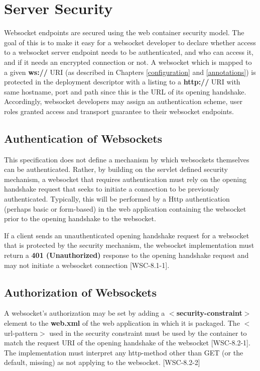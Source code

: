\chapter{Server Security}
\label{security}

Websocket endpoints are secured using the web container security model. The goal of this is to make it easy for a websocket developer to declare whether access to a websocket server endpoint needs to be authenticated, and who can access it, and if it needs an encrypted connection or not. A websocket which is mapped to a given \textbf{ws://} URI (as described in Chapters \ref{configuration} and \ref{annotations}) is protected in the deployment descriptor with a listing to a \textbf{http://} URI with same hostname, port and path since this is the URL of its opening handshake.
Accordingly, websocket developers may assign an authentication scheme, user roles granted access and transport guarantee to their websocket endpoints. 

\section{Authentication of Websockets}

This specification does not define a mechanism by which websockets themselves can be authenticated. Rather, by building on the servlet defined security mechanism, a websocket that requires authentication must rely on the opening handshake request that seeks to initiate a connection to be previously authenticated. Typically, this will be performed by a Http authentication (perhaps basic or form-based) in the web application containing the websocket prior to the opening handshake to the websocket.

If a client sends an unauthenticated opening handshake request for a websocket that is protected by the security mechanism, the websocket implementation must return a \textbf{401 (Unauthorized)} response to the opening handshake request and may not initiate a websocket connection [WSC-8.1-1].

\section{Authorization of Websockets}

A websocket’s authorization may be set by adding a \textbf{$<$security-constraint$>$} element to the \textbf{web.xml} of the web application in which it is packaged. The $<$url-pattern$>$ used in the security constraint must be used by the container to match the request URI of the opening handshake of the websocket [WSC-8.2-1]. The implementation must interpret any http-method other than GET (or the default, missing) as not applying to the websocket. [WSC-8.2-2]

